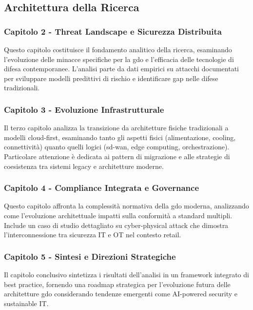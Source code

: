 \subsection{Architettura della Ricerca}
\label{subsec:architettura-ricerca}

\subsubsection{Capitolo 2 - Threat Landscape e Sicurezza Distribuita}

Questo capitolo costituisce il fondamento analitico della ricerca, esaminando l'evoluzione delle minacce specifiche per la \gls{gdo} e l'efficacia delle tecnologie di difesa contemporanee. L'analisi parte da dati empirici su attacchi documentati per sviluppare modelli predittivi di rischio e identificare gap nelle difese tradizionali.

\subsubsection{Capitolo 3 - Evoluzione Infrastrutturale}

Il terzo capitolo analizza la transizione da architetture fisiche tradizionali a modelli cloud-first, esaminando tanto gli aspetti fisici (alimentazione, cooling, connettività) quanto quelli logici (\gls{sd-wan}, edge computing, orchestrazione). Particolare attenzione è dedicata ai pattern di migrazione e alle strategie di coesistenza tra sistemi legacy e architetture moderne.

\subsubsection{Capitolo 4 - Compliance Integrata e Governance}

Questo capitolo affronta la complessità normativa della \gls{gdo} moderna, analizzando come l'evoluzione architettuale impatti sulla conformità a standard multipli. Include un caso di studio dettagliato su cyber-physical attack che dimostra l'interconnessione tra sicurezza IT e OT nel contesto retail.

\subsubsection{Capitolo 5 - Sintesi e Direzioni Strategiche}

Il capitolo conclusivo sintetizza i risultati dell'analisi in un framework integrato di best practice, fornendo una roadmap strategica per l'evoluzione futura delle architetture \gls{gdo} considerando tendenze emergenti come AI-powered security e sustainable IT.

